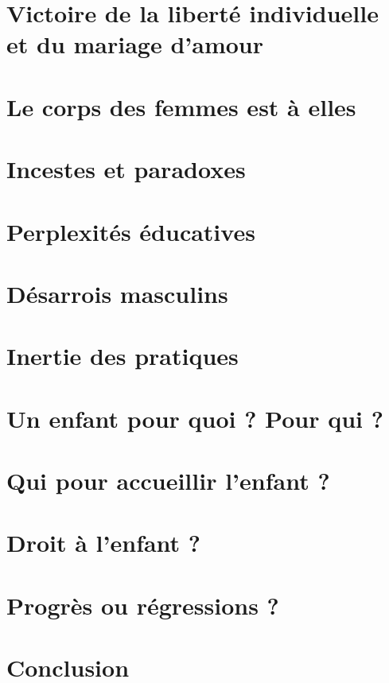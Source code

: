 \documentclass[12pt,french]{book}
\begin{document}
\chapter[Victoire de la liberté individuelle et du mariage d'amour]{Victoire de la liberté individuelle\\et du mariage d'amour}


\chapter{Le corps des femmes est à elles}


\chapter{Incestes et paradoxes}


\chapter{Perplexités éducatives}


\chapter{Désarrois masculins}


\chapter{Inertie des pratiques}


\chapter{Un enfant pour quoi ? Pour qui ?}


\chapter{Qui pour accueillir l'enfant ?}


\chapter{Droit à l'enfant ?}


\chapter{Progrès ou régressions ?}


\chapter{Conclusion}



\backmatter

\tableofcontents
\end{document}
